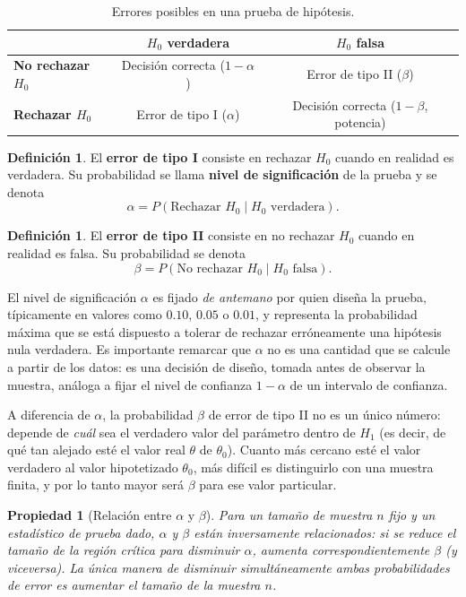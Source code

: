 \documentclass[11pt,a4paper]{article}
\theoremstyle{plain}
\newtheorem{propiedad}[teorema]{Propiedad}
\theoremstyle{definition}
\newtheorem{definicion}[teorema]{Definición}
\theoremstyle{remark}
\begin{document}
\begin{table}[h]
\centering
\begin{tabular}{@{}lcc@{}}
\toprule
 & $H_0$ verdadera & $H_0$ falsa \\
\midrule
\textbf{No rechazar $H_0$} & Decisión correcta ($1-\alpha$) & Error de tipo II ($\beta$) \\
\textbf{Rechazar $H_0$} & Error de tipo I ($\alpha$) & Decisión correcta ($1-\beta$, potencia) \\
\bottomrule
\end{tabular}
\caption{Errores posibles en una prueba de hipótesis.}
\end{table}

\begin{definicion}
El \textbf{error de tipo I} consiste en rechazar $H_0$ cuando en realidad es verdadera. Su probabilidad se llama \textbf{nivel de significación} de la prueba y se denota
\[
\alpha = P(\text{Rechazar } H_0 \mid H_0 \text{ verdadera}).
\]
\end{definicion}

\begin{definicion}
El \textbf{error de tipo II} consiste en no rechazar $H_0$ cuando en realidad es falsa. Su probabilidad se denota
\[
\beta = P(\text{No rechazar } H_0 \mid H_0 \text{ falsa}).
\]
\end{definicion}

El nivel de significación $\alpha$ es fijado \emph{de antemano} por quien diseña la prueba, típicamente en valores como $0.10$, $0.05$ o $0.01$, y representa la probabilidad máxima que se está dispuesto a tolerar de rechazar erróneamente una hipótesis nula verdadera. Es importante remarcar que $\alpha$ no es una cantidad que se calcule a partir de los datos: es una decisión de diseño, tomada antes de observar la muestra, análoga a fijar el nivel de confianza $1-\alpha$ de un intervalo de confianza.

A diferencia de $\alpha$, la probabilidad $\beta$ de error de tipo II no es un único número: depende de \emph{cuál} sea el verdadero valor del parámetro dentro de $H_1$ (es decir, de qué tan alejado esté el valor real $\theta$ de $\theta_0$). Cuanto más cercano esté el valor verdadero al valor hipotetizado $\theta_0$, más difícil es distinguirlo con una muestra finita, y por lo tanto mayor será $\beta$ para ese valor particular.

\begin{propiedad}[Relación entre $\alpha$ y $\beta$]
Para un tamaño de muestra $n$ fijo y un estadístico de prueba dado, $\alpha$ y $\beta$ están inversamente relacionados: si se reduce el tamaño de la región crítica para disminuir $\alpha$, aumenta correspondientemente $\beta$ (y viceversa). La única manera de disminuir \emph{simultáneamente} ambas probabilidades de error es aumentar el tamaño de la muestra $n$.
\end{propiedad}
\end{document}
